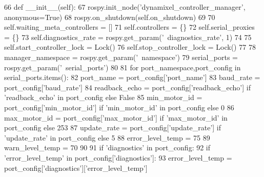\begin{DoxyCode}
66     \textcolor{keyword}{def }\_\_init\_\_(self):
67         rospy.init\_node(\textcolor{stringliteral}{'dynamixel\_controller\_manager'}, anonymous=\textcolor{keyword}{True})
68         rospy.on\_shutdown(self.on\_shutdown)
69         
70         self.waiting\_meta\_controllers = []
71         self.controllers = \{\}
72         self.serial\_proxies = \{\}
73         self.diagnostics\_rate = rospy.get\_param(\textcolor{stringliteral}{'~diagnostics\_rate'}, 1)
74         
75         self.start\_controller\_lock = Lock()
76         self.stop\_controller\_lock = Lock()
77 
78         manager\_namespace = rospy.get\_param(\textcolor{stringliteral}{'~namespace'})
79         serial\_ports = rospy.get\_param(\textcolor{stringliteral}{'~serial\_ports'})
80         
81         \textcolor{keywordflow}{for} port\_namespace,port\_config \textcolor{keywordflow}{in} serial\_ports.items():
82             port\_name = port\_config[\textcolor{stringliteral}{'port\_name'}]
83             baud\_rate = port\_config[\textcolor{stringliteral}{'baud\_rate'}]
84             readback\_echo = port\_config[\textcolor{stringliteral}{'readback\_echo'}] \textcolor{keywordflow}{if} \textcolor{stringliteral}{'readback\_echo'} \textcolor{keywordflow}{in} port\_config \textcolor{keywordflow}{else} \textcolor{keyword}{False}
85             min\_motor\_id = port\_config[\textcolor{stringliteral}{'min\_motor\_id'}] \textcolor{keywordflow}{if} \textcolor{stringliteral}{'min\_motor\_id'} \textcolor{keywordflow}{in} port\_config \textcolor{keywordflow}{else} 0
86             max\_motor\_id = port\_config[\textcolor{stringliteral}{'max\_motor\_id'}] \textcolor{keywordflow}{if} \textcolor{stringliteral}{'max\_motor\_id'} \textcolor{keywordflow}{in} port\_config \textcolor{keywordflow}{else} 253
87             update\_rate = port\_config[\textcolor{stringliteral}{'update\_rate'}] \textcolor{keywordflow}{if} \textcolor{stringliteral}{'update\_rate'} \textcolor{keywordflow}{in} port\_config \textcolor{keywordflow}{else} 5
88             error\_level\_temp = 75
89             warn\_level\_temp = 70
90             
91             \textcolor{keywordflow}{if} \textcolor{stringliteral}{'diagnostics'} \textcolor{keywordflow}{in} port\_config:
92                 \textcolor{keywordflow}{if} \textcolor{stringliteral}{'error\_level\_temp'} \textcolor{keywordflow}{in} port\_config[\textcolor{stringliteral}{'diagnostics'}]:
93                     error\_level\_temp = port\_config[\textcolor{stringliteral}{'diagnostics'}][\textcolor{stringliteral}{'error\_level\_temp'}]

\end{DoxyCode}
